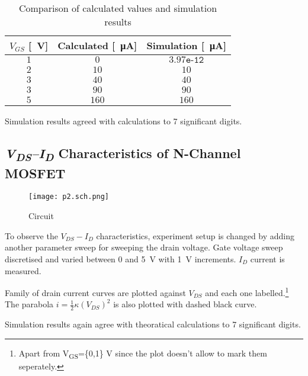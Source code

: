 \documentclass[../main.tex]{subfiles}
\begin{document}
        \begin{table}[H] \centering
            \begin{tabular}{|c||c|c|}
                \hline
                $V_{GS}$ [\SI{}{\volt}] & Calculated [\SI{}{\micro\ampere}] & Simulation [\SI{}{\micro\ampere}] \\
                \hline
                \hline  $1$     &$0$     &    $3.97\texttt{e-12}$    \\
                \hline  $2$    &$10$    &    $10$    \\
                \hline  $3$    &$40$    &    $40$    \\
                \hline  $3$    &$90$    &    $90$    \\
                \hline  $5$   &$160$   &    $160$    \\
                \hline
            \end{tabular} \caption{Comparison of calculated values and simulation results} \label{tab:comp_Vgs_Id}
            \end{table}
        
        Simulation results agreed with calculations to 7 significant digits.


    \subsection{\textit{V\textsubscript{DS}--I\textsubscript{D}} Characteristics of N-Channel MOSFET}
        \begin{figure}[H]\centering
            \texttt{[image: p2.sch.png]}
            \caption{Circuit}\label{fig:p2.sch}
        \end{figure}

        To observe the $V_{DS}-I_D$ characteristics, experiment setup is changed by adding another parameter 
        sweep for sweeping the drain voltage. Gate voltage sweep discretised and varied between 0 and \SI{5}{\volt}
        with \SI{1}{\volt} increments. $I_D$ current is measured.
        
        Family of drain current curves are plotted against $V_{DS}$ and each one labelled.\footnote{Apart from V\textsubscript{GS}=\{0,1\} V since the plot doesn't allow to mark them seperately.}
        The parabola $i=\frac{1}{2}\kappa(V_{DS})^2$ is also plotted with dashed black curve.
        
        Simulation results again agree with theoratical calculations to 7 significant digits.
\end{document}

